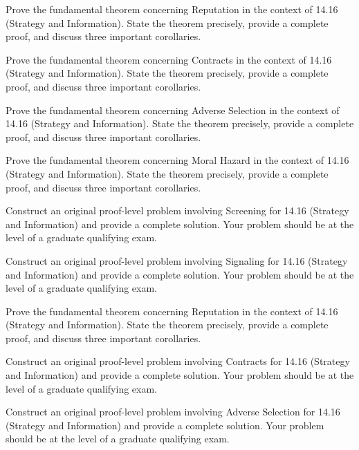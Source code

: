 \documentclass[12pt,a4paper]{exam}
\begin{document}
\begin{questions}
\vspace{0.3cm}

\question[7]
Prove the fundamental theorem concerning Reputation in the context of 14.16 (Strategy and Information). State the theorem precisely, provide a complete proof, and discuss three important corollaries.

\vspace{0.3cm}

\question[4]
Prove the fundamental theorem concerning Contracts in the context of 14.16 (Strategy and Information). State the theorem precisely, provide a complete proof, and discuss three important corollaries.

\vspace{0.3cm}

\question[4]
Prove the fundamental theorem concerning Adverse Selection in the context of 14.16 (Strategy and Information). State the theorem precisely, provide a complete proof, and discuss three important corollaries.

\vspace{0.3cm}

\question[3]
Prove the fundamental theorem concerning Moral Hazard in the context of 14.16 (Strategy and Information). State the theorem precisely, provide a complete proof, and discuss three important corollaries.

\vspace{0.3cm}

\question[4]
Construct an original proof-level problem involving Screening for 14.16 (Strategy and Information) and provide a complete solution. Your problem should be at the level of a graduate qualifying exam.

\vspace{0.3cm}

\question[5]
Construct an original proof-level problem involving Signaling for 14.16 (Strategy and Information) and provide a complete solution. Your problem should be at the level of a graduate qualifying exam.

\vspace{0.3cm}

\question[3]
Prove the fundamental theorem concerning Reputation in the context of 14.16 (Strategy and Information). State the theorem precisely, provide a complete proof, and discuss three important corollaries.

\vspace{0.3cm}

\question[3]
Construct an original proof-level problem involving Contracts for 14.16 (Strategy and Information) and provide a complete solution. Your problem should be at the level of a graduate qualifying exam.

\vspace{0.3cm}

\question[2]
Construct an original proof-level problem involving Adverse Selection for 14.16 (Strategy and Information) and provide a complete solution. Your problem should be at the level of a graduate qualifying exam.

\vspace{0.3cm}

\end{questions}
\end{document}
